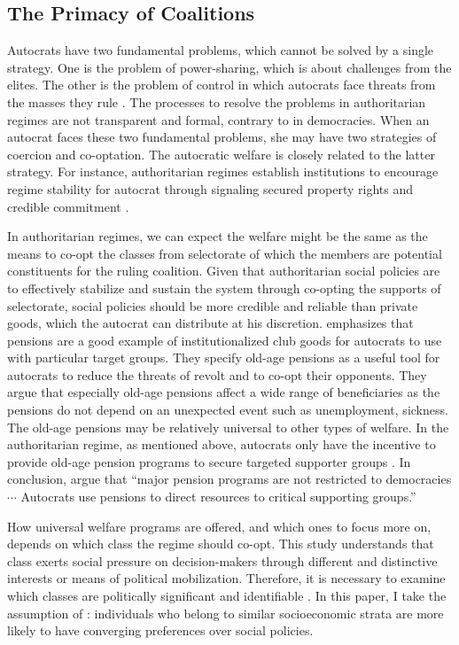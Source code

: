 \documentclass[12pt, letterpage, notitlepage]{article}
\begin{document}
\subsection{The Primacy of Coalitions}

Autocrats have two fundamental problems, which cannot be solved by a single strategy. One is the problem of power-sharing, which is about challenges from the elites. The other is the problem of control in which autocrats face threats from the masses they rule \citep{Svolik2012}. The processes to resolve the problems in authoritarian regimes are not transparent and formal, contrary to in democracies. When an autocrat faces these two fundamental problems, she may have two strategies of coercion and co-optation. The autocratic welfare is closely related to the latter strategy. For instance, authoritarian regimes establish institutions to encourage regime stability for autocrat through signaling secured property rights and credible commitment \citep{Gandhi2007, Wright2008}.

In authoritarian regimes, we can expect the welfare might be the same as the means to co-opt the classes from selectorate of which the members are potential constituents for the ruling coalition. Given that authoritarian social policies are to effectively stabilize and sustain the system through co-opting the supports of selectorate, social policies should be more credible and reliable than private goods, which the autocrat can distribute at his discretion. \citet{Knutsen2018} emphasizes that pensions are a good example of institutionalized club goods for autocrats to use with particular target groups. They specify old-age pensions as a useful tool for autocrats to reduce the threats of revolt and to co-opt their opponents. They argue that especially old-age pensions affect a wide range of beneficiaries as the pensions do not depend on an unexpected event such as unemployment, sickness. The old-age pensions may be relatively universal to other types of welfare. In the authoritarian regime, as mentioned above, autocrats only have the incentive to provide old-age pension programs to secure targeted supporter groups \citep[670]{Knutsen2018}. In conclusion, \citet[688]{Knutsen2018} argue that ``major pension programs are not restricted to democracies $\cdots$ Autocrats use pensions to direct resources to critical supporting groups.''

How universal welfare programs are offered, and which ones to focus more on, depends on which class the regime should co-opt. This study understands that class exerts social pressure on decision-makers through different and distinctive interests or means of political mobilization. Therefore, it is necessary to examine which classes are politically significant and identifiable \citep{Bean1998}. In this paper, I take the assumption of \citet[1495]{Dahlum2019}: individuals who belong to similar socioeconomic strata are more likely to have converging preferences over social policies.
\end{document}
